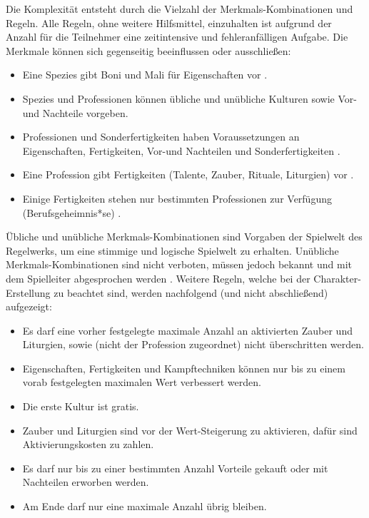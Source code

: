 Die Komplexität entsteht durch die Vielzahl der Merkmals-Kombinationen und Regeln.
Alle Regeln, ohne weitere Hilfsmittel, einzuhalten ist aufgrund der Anzahl für die Teilnehmer eine zeitintensive und fehleranfälligen Aufgabe.
Die \og Merkmale können sich \bspw gegenseitig beeinflussen oder ausschließen:
\begin{itemize}
    \item Eine Spezies gibt Boni und Mali für Eigenschaften vor .
    \item Spezies und Professionen können übliche und unübliche Kulturen sowie Vor- und Nachteile vorgeben. 
    \item Professionen und Sonderfertigkeiten haben Voraussetzungen \uA \ggfs an Eigenschaften, Fertigkeiten, Vor-und Nachteilen und Sonderfertigkeiten .
    \item Eine Profession gibt Fertigkeiten (Talente, Zauber, Rituale, Liturgien) vor .
    \item Einige Fertigkeiten stehen nur bestimmten Professionen zur Verfügung (\sog Berufsgeheimnis*se) .
\end{itemize}

Übliche und unübliche Merkmals-Kombinationen sind Vorgaben der Spielwelt \bzw des Regelwerks, um eine stimmige und logische Spielwelt zu erhalten.
Unübliche Merkmals-Kombinationen sind nicht verboten, müssen jedoch bekannt und mit dem Spielleiter abgesprochen werden .
Weitere Regeln, welche bei der Charakter-Erstellung zu beachtet sind, werden nachfolgend (und nicht abschließend) aufgezeigt:
\begin{itemize}
    \item Es darf eine vorher festgelegte maximale Anzahl an aktivierten Zauber und Liturgien, sowie  (nicht der Profession zugeordnet) nicht überschritten werden. 
    \item Eigenschaften, Fertigkeiten und Kampftechniken können nur bis zu einem vorab festgelegten maximalen Wert verbessert werden. 
    \item Die erste Kultur ist gratis. 
    \item Zauber und Liturgien sind vor der Wert-Steigerung zu aktivieren, dafür sind Aktivierungskosten zu zahlen. 
    \item Es darf nur bis zu einer bestimmten Anzahl  Vorteile gekauft oder mit Nachteilen erworben werden. 
    \item Am Ende darf nur eine maximale Anzahl  übrig bleiben. 
\end{itemize}



